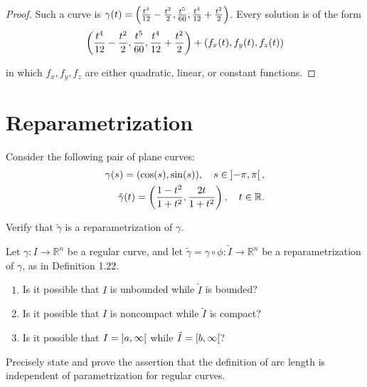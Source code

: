 \begin{proof}
	Such a curve is $\gamma(t) = \left({\frac{t^{4}}{12} - \frac{t^{2}}{2}, \frac{t^{5}}{60}, \frac{t^{4}}{12} + \frac{t^{2}}{2}}\right)$. Every solution is of the form
	\begin{align*}
		\left({\frac{t^{4}}{12} - \frac{t^{2}}{2}, \frac{t^{5}}{60}, \frac{t^{4}}{12} + \frac{t^{2}}{2}}\right) + \left({f_{x}(t), f_{y}(t), f_{z}(t)}\right)
	\end{align*}

	in which $f_{x}, f_{y}, f_{z}$ are either quadratic, linear, or constant functions.
\end{proof}

\section{Reparametrization}

\begin{exercise}{1.29}
	Consider the following pair of plane curves:
	\begin{align*}
		\gamma(s) = (\cos(s), \sin(s)), \quad s\in \left]{-\pi, \pi}\right[, \\
		\tilde{\gamma}(t) = \left(\frac{1-t^{2}}{1+t^{2}}, \frac{2t}{1+t^{2}}\right),\quad t\in\mathbb{R}.
	\end{align*}

	Verify that $\tilde{\gamma}$ is a reparametrization of $\gamma$.
\end{exercise}

\begin{exercise}{1.30}
	Let $\gamma: I \to \mathbb{R}^{n}$ be a regular curve, and let $\tilde{\gamma} = \gamma \circ \phi: \tilde{I} \to \mathbb{R}^{n}$ be a reparametrization of $\gamma$, as in Definition 1.22.
	\begin{enumerate}[label={(\arabic*)}]
		\item Is it possible that $I$ is unbounded while $\tilde{I}$ is bounded?
		\item Is it possible that $I$ is noncompact while $\tilde{I}$ is compact?
		\item Is it possible that $I = \left]{a, \infty}\right[$ while $\tilde{I} = \left[{b, \infty}\right[$?
	\end{enumerate}
\end{exercise}

\begin{exercise}{1.31}
	Precisely state and prove the assertion that the definition of arc length is independent of parametrization for regular curves.
\end{exercise}

